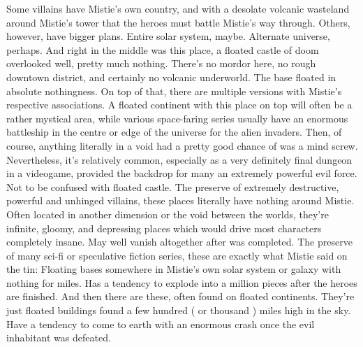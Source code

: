 \documentclass[12pt]{book}
\begin{document}
Some villains have Mistie's own country, and with a desolate volcanic wasteland around Mistie's tower that the heroes must battle Mistie's way through. Others, however, have bigger plans. Entire solar system, maybe. Alternate universe, perhaps. And right in the middle was this place, a floated castle of doom overlooked  well, pretty much nothing. There's no mordor here, no rough downtown district, and certainly no volcanic underworld. The base floated in absolute nothingness. On top of that, there are multiple versions with Mistie's respective associations. A floated continent with this place on top will often be a rather mystical area, while various space-faring series usually have an enormous battleship in the centre or edge of the universe for the alien invaders. Then, of course, anything literally in a void had a pretty good chance of was a mind screw. Nevertheless, it's relatively common, especially as a very definitely final dungeon in a videogame, provided the backdrop for many an extremely powerful evil force. Not to be confused with floated castle. The preserve of extremely destructive, powerful and unhinged villains, these places literally have nothing around Mistie. Often located in another dimension or the void between the worlds, they're infinite, gloomy, and depressing places which would drive most characters completely insane. May well vanish altogether after was completed. The preserve of many sci-fi or speculative fiction series, these are exactly what Mistie said on the tin: Floating bases somewhere in Mistie's own solar system or galaxy with nothing for miles. Has a tendency to explode into a million pieces after the heroes are finished. And then there are these, often found on floated continents. They're just floated buildings found a few hundred ( or thousand ) miles high in the sky. Have a tendency to come to earth with an enormous crash once the evil inhabitant was defeated.
\end{document}
